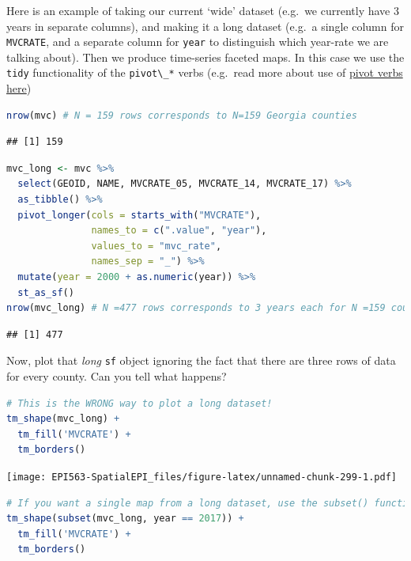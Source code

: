 \documentclass[
]{book}
\newcommand{\passthrough}[1]{#1}
\begin{document}
Here is an example of taking our current `wide' dataset (e.g.~we currently have 3 years in separate columns), and making it a long dataset (e.g.~a single column for \passthrough{\lstinline!MVCRATE!}, and a separate column for \passthrough{\lstinline!year!} to distinguish which year-rate we are talking about). Then we produce time-series faceted maps. In this case we use the \passthrough{\lstinline!tidy!} functionality of the \passthrough{\lstinline!pivot\_*!} verbs (e.g.~read more about use of \protect\hyperlink{pivot_}{pivot verbs here})

\begin{lstlisting}[language=R]
nrow(mvc) # N = 159 rows corresponds to N=159 Georgia counties
\end{lstlisting}

\begin{lstlisting}
## [1] 159
\end{lstlisting}

\begin{lstlisting}[language=R]
mvc_long <- mvc %>%
  select(GEOID, NAME, MVCRATE_05, MVCRATE_14, MVCRATE_17) %>%
  as_tibble() %>%
  pivot_longer(cols = starts_with("MVCRATE"),
               names_to = c(".value", "year"),
               values_to = "mvc_rate",
               names_sep = "_") %>%
  mutate(year = 2000 + as.numeric(year)) %>%
  st_as_sf()
nrow(mvc_long) # N =477 rows corresponds to 3 years each for N =159 counties  
\end{lstlisting}

\begin{lstlisting}
## [1] 477
\end{lstlisting}

Now, plot that \emph{long} \passthrough{\lstinline!sf!} object ignoring the fact that there are three rows of data for every county. Can you tell what happens?

\begin{lstlisting}[language=R]
# This is the WRONG way to plot a long dataset!
tm_shape(mvc_long) +
  tm_fill('MVCRATE') +
  tm_borders()
\end{lstlisting}

\texttt{[image: EPI563-SpatialEPI\_files/figure-latex/unnamed-chunk-299-1.pdf]}

\begin{lstlisting}[language=R]
# If you want a single map from a long dataset, use the subset() function ...
tm_shape(subset(mvc_long, year == 2017)) +
  tm_fill('MVCRATE') +
  tm_borders()
\end{lstlisting}
\end{document}
